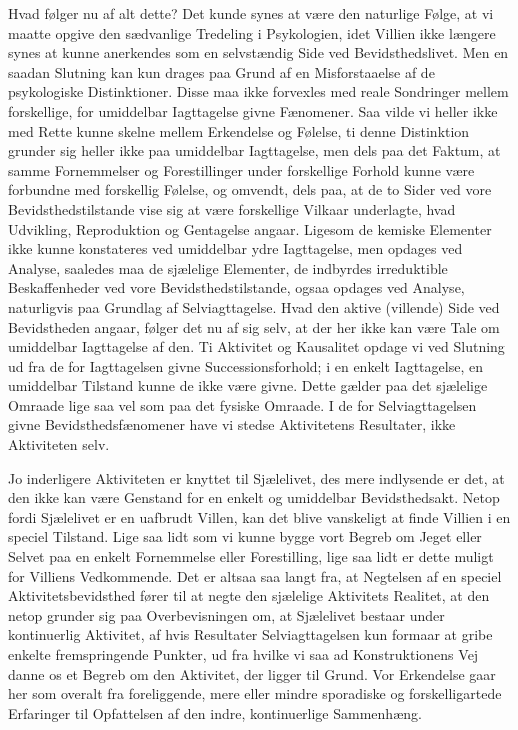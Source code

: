 \documentclass[12pt,a4paper,openany]{book}
\newcommand{\opage}[1]{\marginnote{\footnotesize\textit{[#1]}}}
\begin{document}
Hvad følger nu af alt dette? Det kunde synes at være den naturlige Følge, at vi
maatte opgive den sædvanlige Tredeling i Psykologien, idet Villien ikke længere
synes at kunne anerkendes som en selvstændig Side ved Bevidsthedslivet. Men en
saadan Slutning kan kun drages paa Grund af en Misforstaaelse af de
psykologiske Distinktioner. Disse maa ikke forvexles med reale Sondringer
mellem forskellige, for umiddelbar Iagttagelse givne Fænomener. Saa vilde vi
heller ikke med Rette kunne skelne mellem Erkendelse og Følelse, ti denne
Distinktion grunder sig heller ikke paa umiddelbar Iagttagelse, men dels paa
det Faktum, at samme Fornemmelser og Forestillinger under forskellige Forhold
kunne være forbundne med forskellig Følelse, og omvendt, dels paa, at de to
Sider ved vore Bevidsthedstilstande vise sig at være forskellige Vilkaar
underlagte, hvad Udvikling, Reproduktion og Gentagelse angaar. Ligesom de
kemiske Elementer ikke kunne konstateres ved umiddelbar ydre Iagttagelse, men
opdages ved Analyse, saaledes maa de sjælelige Elementer, de indbyrdes
irreduktible Beskaffenheder ved vore Bevidsthedstilstande, ogsaa opdages ved
Analyse, naturligvis paa Grundlag af Selviagttagelse. Hvad den aktive
(villende) Side ved Bevidstheden angaar, følger det nu af sig selv, at der her
ikke kan være Tale om umiddelbar Iagttagelse af den. Ti Aktivitet og Kausalitet
opdage vi ved Slutning ud fra de for Iagttagelsen givne Successionsforhold; i
en enkelt Iagttagelse, en umiddelbar Tilstand kunne de ikke være givne. Dette
gælder paa det sjælelige Omraade lige saa vel som paa det fysiske Omraade. I de
for Selviagttagelsen givne Bevidsthedsfænomener have vi stedse Aktivitetens
Resultater, ikke Aktiviteten selv.

Jo inderligere Aktiviteten er knyttet til Sjælelivet, des mere indlysende er
det, at den ikke kan være Genstand for en enkelt og umiddelbar Bevidsthedsakt.
Netop fordi Sjælelivet er en uafbrudt Villen, kan det blive vanskeligt at finde
Villien i en speciel Tilstand. Lige saa lidt som vi kunne bygge vort Begreb om
Jeget eller Selvet paa en enkelt Fornemmelse eller Forestilling, lige saa lidt
er dette muligt for Villiens Vedkommende. Det er altsaa saa langt fra, at
Negtelsen af en speciel Aktivitetsbevidsthed fører til at negte den sjælelige
Aktivitets Realitet, at den netop grunder sig paa Overbevisningen om, at
\setcounter{footnote}{0}%
\opage{77}Sjælelivet bestaar under kontinuerlig Aktivitet, af hvis Resultater
Selviagttagelsen kun formaar at gribe enkelte fremspringende Punkter, ud fra
hvilke vi saa ad Konstruktionens Vej danne os et Begreb om den Aktivitet, der
ligger til Grund. Vor Erkendelse gaar her som overalt fra foreliggende, mere
eller mindre sporadiske og forskelligartede Erfaringer til Opfattelsen af den
indre, kontinuerlige Sammenhæng.
\end{document}
